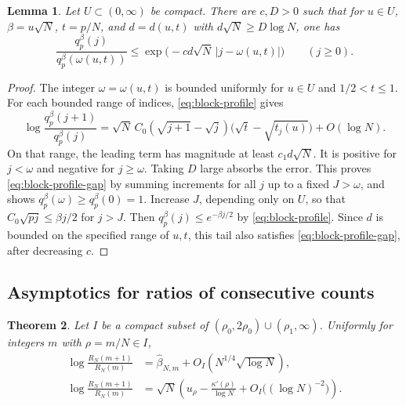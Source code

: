\documentclass[11pt]{amsart}
\newtheorem{theorem}{Theorem}[section]
\newtheorem{lemma}[theorem]{Lemma}
\theoremstyle{remark}
\begin{document}
\begin{lemma}
\label{lem:block-profile-gap}
Let \(U\subset(0,\infty)\) be compact. There are \(c,D>0\) such that
for \(u\in U\), \(\beta=u\sqrt N\), \(t=p/N\), and \(d=d(u,t)\) with
\(d\sqrt N\ge D\log N\), one has
\begin{equation}
\label{eq:block-profile-gap}
 \frac{q_p^\beta(j)}{q_p^\beta(\omega(u,t))}
 \le \exp\!\bigl(-c d\sqrt N\,|j-\omega(u,t)|\bigr)
 \qquad(j\ge 0).
\end{equation}
\end{lemma}

\begin{proof}
The integer \(\omega=\omega(u,t)\) is bounded uniformly for \(u\in U\) and \(1/2<t\le1\).
For each bounded range of indices, \eqref{eq:block-profile} gives
\[
 \log\frac{q_p^\beta(j+1)}{q_p^\beta(j)}
 =\sqrt N\,C_0(\sqrt{j+1}-\sqrt j)
     \bigl(\sqrt t-\sqrt{t_j(u)}\bigr)+O(\log N).
\]
On that range, the leading term has magnitude at least \(c_1 d\sqrt N\).
It is positive for \(j<\omega\) and negative for \(j\ge\omega\).
Taking \(D\) large absorbs the error. This proves
\eqref{eq:block-profile-gap} by summing increments for all \(j\) up to a
fixed \(J>\omega\), and shows \(q_p^\beta(\omega)\ge q_p^\beta(0)=1\).
Increase \(J\), depending only on \(U\), so that
\(C_0\sqrt{pj}\le\beta j/2\) for \(j>J\). Then
\(q_p^\beta(j)\le e^{-\beta j/2}\) by \eqref{eq:block-profile}.
Since \(d\) is bounded on the specified range of \(u,t\), this tail also
satisfies \eqref{eq:block-profile-gap}, after decreasing \(c\).
\end{proof}

\subsection{Asymptotics for ratios of consecutive counts}

\begin{theorem}
\label{thm:ratio}
Let \(I\) be a compact subset of \((\rho_0,2\rho_0)\cup(\rho_1,\infty)\). Uniformly for
integers \(m\) with \(\rho=m/N\in I\),
\begin{align}
\label{eq:ratio-at-saddle}
 \log\frac{R_N(m+1)}{R_N(m)}
 &=\widehat\beta_{N,m}+O_I(N^{1/4}\sqrt{\log N}),\\
\label{eq:ratio-two-term}
 \log\frac{R_N(m+1)}{R_N(m)}
 &=\sqrt N\left(u_\rho-\frac{\kappa'(\rho)}{\log N}
              +O_I\bigl((\log N)^{-2}\bigr)\right).
\end{align}
\end{theorem}
\end{document}
